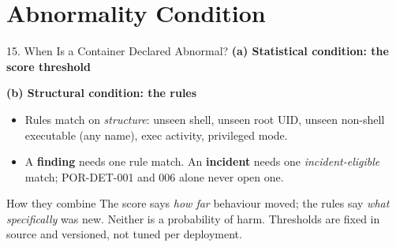 \documentclass[aspectratio=169, 11pt]{beamer}
\begin{document}
\section{Abnormality Condition}
\begin{frame}{15. When Is a Container Declared Abnormal?}
    \footnotesize
    \textbf{(a) Statistical condition: the score threshold}
    \begin{center}
    \end{center}
    \vspace{-0.05cm}
    \textbf{(b) Structural condition: the rules}
    \begin{itemize}\setlength\itemsep{1pt}
        \item Rules match on \emph{structure}: unseen shell, unseen root UID, unseen non-shell executable (any name), exec activity, privileged mode.
        \item A \textbf{finding} needs one rule match. An \textbf{incident} needs one \emph{incident-eligible} match; POR-DET-001 and 006 alone never open one.
    \end{itemize}
    \begin{block}{\scriptsize How they combine}
        \scriptsize The score says \emph{how far} behaviour moved; the rules say \emph{what specifically} was new. Neither is a probability of harm. Thresholds are fixed in source and versioned, not tuned per deployment.
    \end{block}
\end{frame}
\end{document}
